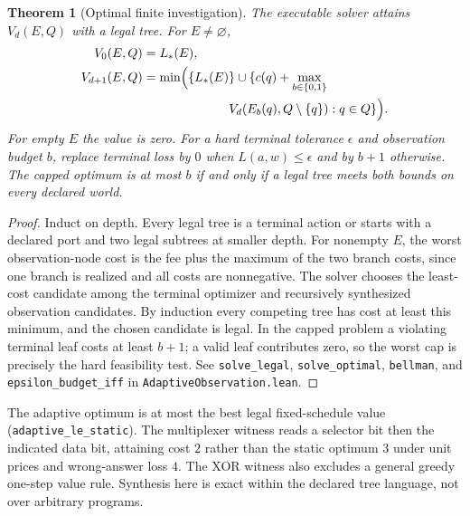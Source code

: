 \documentclass[10pt,letterpaper]{article}
\newtheorem{theorem}{Theorem}[section]
\newcommand{\rc}[1]{\texttt{#1}}
\begin{document}
\begin{theorem}[Optimal finite investigation]\label{thm:investigation}
The executable solver attains $V_d(E,Q)$ with a legal tree. For $E\ne\varnothing$,
\begin{align}
 V_0(E,Q)&=L_*(E),\\
 V_{d+1}(E,Q)&=\min\Bigl(\{L_*(E)\}\cup\{c(q)+\max_{b\in\{0,1\}} \\
 &\hspace{24mm} V_d(E_b(q),Q\setminus\{q\}):q\in Q\}\Bigr).
\end{align}
For empty $E$ the value is zero. For a hard terminal tolerance $\epsilon$ and observation budget $b$, replace terminal loss by $0$ when $L(a,w)\le\epsilon$ and by $b+1$ otherwise. The capped optimum is at most $b$ if and only if a legal tree meets both bounds on every declared world.
\end{theorem}
\begin{proof}
Induct on depth. Every legal tree is a terminal action or starts with a declared port and two legal subtrees at smaller depth. For nonempty $E$, the worst observation-node cost is the fee plus the maximum of the two branch costs, since one branch is realized and all costs are nonnegative. The solver chooses the least-cost candidate among the terminal optimizer and recursively synthesized observation candidates. By induction every competing tree has cost at least this minimum, and the chosen candidate is legal. In the capped problem a violating terminal leaf costs at least $b+1$; a valid leaf contributes zero, so the worst cap is precisely the hard feasibility test. See \rc{solve\_legal}, \rc{solve\_optimal}, \rc{bellman}, and \rc{epsilon\_budget\_iff} in \rc{AdaptiveObservation.lean}.
\end{proof}
The adaptive optimum is at most the best legal fixed-schedule value (\rc{adaptive\_le\_static}). The multiplexer witness reads a selector bit then the indicated data bit, attaining cost $2$ rather than the static optimum $3$ under unit prices and wrong-answer loss $4$. The XOR witness also excludes a general greedy one-step value rule. Synthesis here is exact within the declared tree language, not over arbitrary programs.
\end{document}

